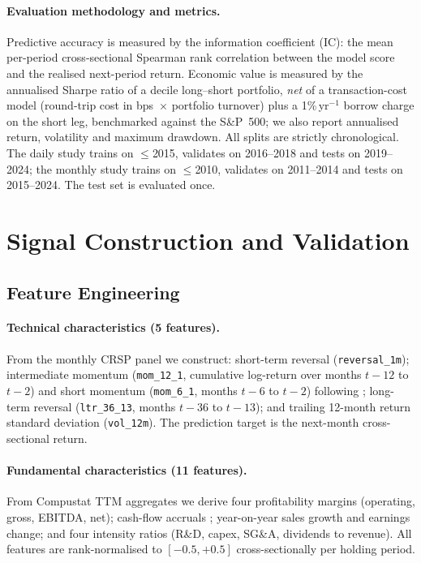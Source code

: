 \documentclass[11pt,a4paper]{article}
\begin{document}
\paragraph{Evaluation methodology and metrics.}
Predictive accuracy is measured by the information coefficient (IC): the mean
per-period cross-sectional Spearman rank correlation between the model score and
the realised next-period return. Economic value is measured by the annualised
Sharpe ratio of a decile long--short portfolio, \emph{net} of a transaction-cost
model (round-trip cost in bps~$\times$ portfolio turnover) plus a
1\%\,yr$^{-1}$ borrow charge on the short leg, benchmarked against the S\&P~500;
we also report annualised return, volatility and maximum drawdown. All splits
are strictly chronological. The daily study trains on $\leq$2015, validates on
2016--2018 and tests on 2019--2024; the monthly study trains on $\leq$2010,
validates on 2011--2014 and tests on 2015--2024. The test set is evaluated once.

\section{Signal Construction and Validation}
\label{sec:signals}

\subsection{Feature Engineering}
\label{sec:features}

\paragraph{Technical characteristics (5 features).}
From the monthly CRSP panel we construct: short-term reversal
(\texttt{reversal\_1m}); intermediate momentum (\texttt{mom\_12\_1},
cumulative log-return over months $t{-}12$ to $t{-}2$) and short momentum
(\texttt{mom\_6\_1}, months $t{-}6$ to $t{-}2$) following
\citet{jegadeeshtitman1993}; long-term reversal (\texttt{ltr\_36\_13},
months $t{-}36$ to $t{-}13$); and trailing 12-month return standard deviation
(\texttt{vol\_12m}). The prediction target is the next-month cross-sectional
return.

\paragraph{Fundamental characteristics (11 features).}
From Compustat TTM aggregates we derive four profitability margins (operating,
gross, EBITDA, net); cash-flow accruals \citep{sloan1996}; year-on-year sales
growth and earnings change; and four intensity ratios (R\&D, capex, SG\&A,
dividends to revenue). All features are rank-normalised to $[-0.5,+0.5]$
cross-sectionally per holding period.
\end{document}

